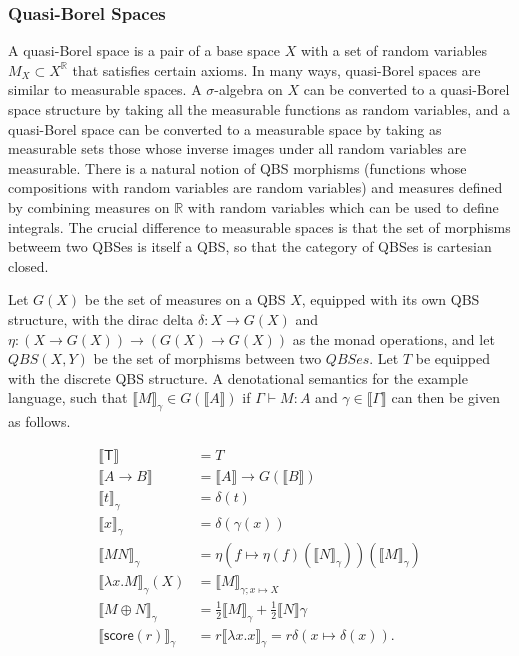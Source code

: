\documentclass[titlepage]{article}
\newcommand{\tscore}{\mathsf{score}}
\newcommand{\denotation}[1]{\llbracket #1 \rrbracket}
\begin{document}
\subsubsection{Quasi-Borel Spaces}
A quasi-Borel space is a pair of a base space $X$ with a set of random variables $M_X \subset X^{\mathbb R}$ that satisfies certain axioms. In many ways, quasi-Borel spaces are similar to measurable spaces. A $\sigma$-algebra on $X$ can be converted to a quasi-Borel space structure by taking all the measurable functions as random variables, and a quasi-Borel space can be converted to a measurable space by taking as measurable sets those whose inverse images under all random variables are measurable. There is a natural notion of QBS morphisms (functions whose compositions with random variables are random variables) and measures defined by combining measures on $\mathbb R$ with random variables which can be used to define integrals. The crucial difference to measurable spaces is that the set of morphisms betweem two QBSes is itself a QBS, so that the category of QBSes is cartesian closed.

Let $G(X)$ be the set of measures on a QBS $X$, equipped with its own QBS structure, with the dirac delta $\delta : X \to G(X)$ and $\eta : (X \to G(X)) \to (G(X) \to G(X))$ as the monad operations, and let $QBS(X, Y)$ be the set of morphisms between two $QBSes$. Let $T$ be equipped with the discrete QBS structure. A denotational semantics for the example language, such that $\denotation M_\gamma \in G(\denotation A)$ if $\Gamma \vdash M : A$ and $\gamma \in \denotation \Gamma$ can then be given as follows.

\begin{align*}
\denotation{\mathsf T} & = T \\
\denotation{A \to B} & = \denotation A \to G(\denotation B) \\
\denotation{t}_\gamma & = \delta(t) \\
\denotation{x}_\gamma & = \delta(\gamma(x)) \\
\denotation{M N}_\gamma & = \eta(f \mapsto \eta(f)(\denotation N_\gamma))(\denotation M_\gamma) \\
\denotation{\lambda x. M}_\gamma(X) & = \denotation M_{\gamma ; x \mapsto X} \\
\denotation{M \oplus N}_\gamma & = \frac 1 2 \denotation M_\gamma + \frac 1 2 \denotation N \gamma \\
\denotation{\tscore(r)}_\gamma & = r \denotation{\lambda x. x}_\gamma = r \delta(x \mapsto \delta(x)).
\end{align*}
\end{document}
